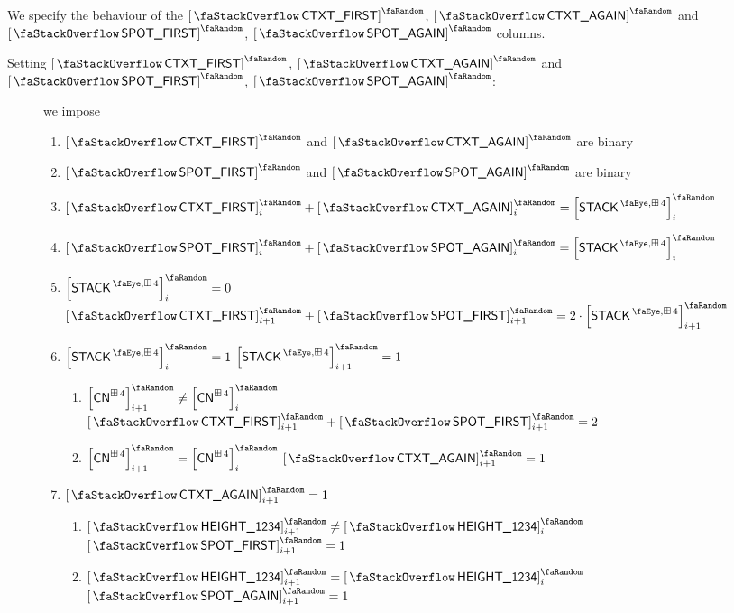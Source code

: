 We specify the behaviour of the $\stackContextFirst$, $\stackContextAgain$ and $\stackSpotFirst$, $\stackSpotAgain$ columns.
\begin{description}
	\item[Setting $\stackContextFirst$, $\stackContextAgain$ and $\stackSpotFirst$, $\stackSpotAgain$:]
		we impose
		\begin{enumerate}
			\item $\stackContextFirst$ and $\stackContextAgain$ are binary
			\item $\stackSpotFirst$    and $\stackSpotAgain$    are binary
			\item $\stackContextFirst _{i} + \stackContextAgain _{i} = \order{\peekStackFour} _{i}$
			\item $\stackSpotFirst    _{i} + \stackSpotAgain    _{i} = \order{\peekStackFour} _{i}$
			\item \If $\order{\peekStackFour}_{i} = 0$ \Then $\stackContextFirst_{i + 1} + \stackSpotFirst_{i + 1} = 2 \cdot \order{\peekStackFour}_{i + 1}$
			\item \If $\order{\peekStackFour}_{i} = 1$ \et $\order{\peekStackFour}_{i + 1} = 1$ \Then
				\begin{enumerate}
					\item \If $\order{\cn^{\cc4}}_{i + 1} \neq \order{\cn^{\cc4}}_{i}$ \Then $\stackContextFirst_{i + 1} + \stackSpotFirst_{i + 1} = 2$
					\item \If $\order{\cn^{\cc4}}_{i + 1} =    \order{\cn^{\cc4}}_{i}$ \Then $\stackContextAgain_{i + 1} = 1$
				\end{enumerate}
			\item \If $\stackContextAgain_{i + 1} = 1$ \Then
				\begin{enumerate}
					\item \If $\order{\stackItemHeight{\col{1234}}}_{i + 1} \neq \order{\stackItemHeight{\col{1234}}}_{i}$ \Then $\stackSpotFirst_{i + 1} = 1$
					\item \If $\order{\stackItemHeight{\col{1234}}}_{i + 1} =    \order{\stackItemHeight{\col{1234}}}_{i}$ \Then $\stackSpotAgain_{i + 1} = 1$
				\end{enumerate}
		\end{enumerate}
\end{description}
